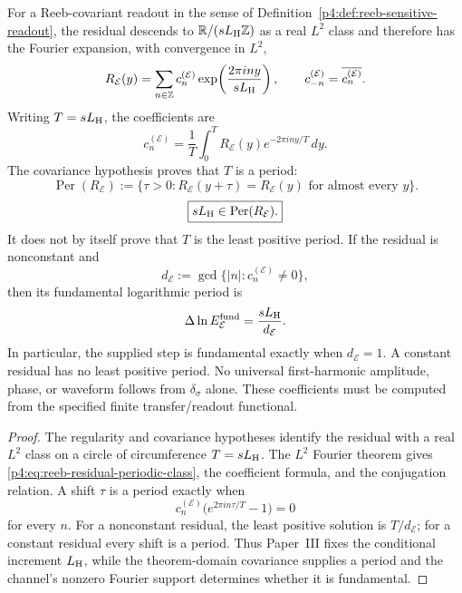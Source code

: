 \documentclass[12pt,a4paper]{article}
\begin{document}
\begin{theorem}
\label{p4:thm:derived-reeb-phase-signature}
For a Reeb-covariant readout in the sense of
Definition~\ref{p4:def:reeb-sensitive-readout}, the residual descends to
\(\mathbb R/(sL_{\rm H}\mathbb Z)\) as a real \(L^2\) class and therefore has
the Fourier expansion, with convergence in \(L^2\),
\begin{equation}
\label{p4:eq:reeb-residual-periodic-class}
R_{\mathcal E}(y)
=
\sum_{n\in\mathbb Z}c_n^{(\mathcal E)}
\exp\!\left(\frac{2\pi iny}{sL_{\rm H}}\right),
\qquad c_{-n}^{(\mathcal E)}=\overline{c_n^{(\mathcal E)}}.
\end{equation}
Writing \(T=sL_{\rm H}\), the coefficients are
\[
c_n^{(\mathcal E)}
=
\frac1T\int_0^T
R_{\mathcal E}(y)e^{-2\pi iny/T}\,dy.
\]
The covariance hypothesis proves that \(T\) is a period:
\[
\operatorname{Per}(R_{\mathcal E})
:=
\{\tau>0:R_{\mathcal E}(y+\tau)=R_{\mathcal E}(y)
\text{ for almost every }y\}.
\]
\begin{equation}
\label{p4:eq:reeb-lab-log-period-derived}
\boxed{sL_{\rm H}\in\operatorname{Per}(R_{\mathcal E}).}
\end{equation}
It does not by itself prove that \(T\) is the least positive period.  If the
residual is nonconstant and
\[
d_{\mathcal E}:=
\gcd\bigl\{|n|:c_n^{(\mathcal E)}\ne0\bigr\},
\]
then its fundamental logarithmic period is
\[
\Delta\ln E_{\mathcal E}^{\rm fund}
=\frac{sL_{\rm H}}{d_{\mathcal E}}.
\]
In particular, the supplied step is fundamental exactly when
\(d_{\mathcal E}=1\).  A constant residual has no least positive period.
No universal first-harmonic amplitude, phase, or waveform follows from
\(\delta_\sigma\) alone.  These coefficients must be computed from the specified finite
transfer/readout functional.
\end{theorem}

\begin{proof}
The regularity and covariance hypotheses identify the residual with a real
\(L^2\) class on a circle of circumference \(T=sL_{\rm H}\).  The \(L^2\)
Fourier theorem gives \eqref{p4:eq:reeb-residual-periodic-class}, the coefficient
formula, and the conjugation relation.  A shift \(\tau\) is a period exactly
when
\[
c_n^{(\mathcal E)}
\bigl(e^{2\pi in\tau/T}-1\bigr)=0
\]
for every \(n\).  For a nonconstant residual, the least positive solution is
\(T/d_{\mathcal E}\); for a constant residual every shift is a period.  Thus
Paper~III fixes the conditional increment \(L_{\rm H}\), while the
theorem-domain covariance supplies a period and the channel's nonzero Fourier
support determines whether it is fundamental.
\end{proof}
\end{document}
